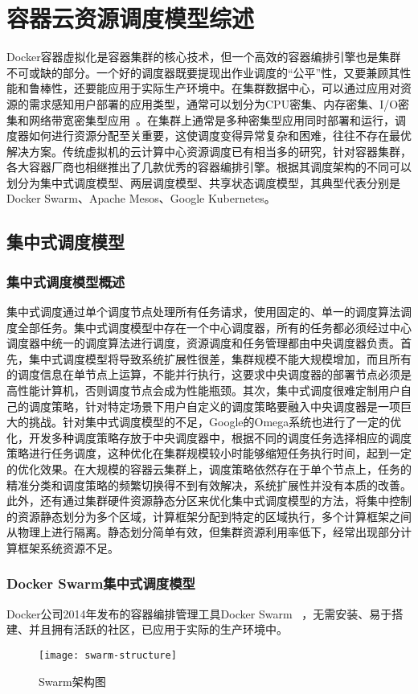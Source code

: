 \chapter{容器云资源调度模型综述}
Docker容器虚拟化是容器集群的核心技术，但一个高效的容器编排引擎也是集群不可或缺的部分。一个好的调度器既要提现出作业调度的“公平”性，又要兼顾其性能和鲁棒性，还要能应用于实际生产环境中。在集群数据中心，可以通过应用对资源的需求感知用户部署的应用类型，通常可以划分为CPU密集、内存密集、I/O密集和网络带宽密集型应用~\cite{Peng2016Research,Shuangke2017SchedulingStrategy}。在集群上通常是多种密集型应用同时部署和运行，调度器如何进行资源分配至关重要，这使调度变得异常复杂和困难，往往不存在最优解决方案。传统虚拟机的云计算中心资源调度已有相当多的研究，针对容器集群，各大容器厂商也相继推出了几款优秀的容器编排引擎。根据其调度架构的不同可以划分为集中式调度模型、两层调度模型、共享状态调度模型，其典型代表分别是Docker Swarm、Apache Mesos、Google Kubernetes。

\section{集中式调度模型}
\subsection{集中式调度模型概述}
集中式调度通过单个调度节点处理所有任务请求，使用固定的、单一的调度算法调度全部任务。集中式调度模型中存在一个中心调度器，所有的任务都必须经过中心调度器中统一的调度算法进行调度，资源调度和任务管理都由中央调度器负责。首先，集中式调度模型将导致系统扩展性很差，集群规模不能大规模增加，而且所有的调度信息在单节点上运算，不能并行执行，这要求中央调度器的部署节点必须是高性能计算机，否则调度节点会成为性能瓶颈。其次，集中式调度很难定制用户自己的调度策略，针对特定场景下用户自定义的调度策略要融入中央调度器是一项巨大的挑战。针对集中式调度模型的不足，Google的Omega系统也进行了一定的优化，开发多种调度策略存放于中央调度器中，根据不同的调度任务选择相应的调度策略进行任务调度，这种优化在集群规模较小时能够缩短任务执行时间，起到一定的优化效果。在大规模的容器云集群上，调度策略依然存在于单个节点上，任务的精准分类和调度策略的频繁切换得不到有效解决，系统扩展性并没有本质的改善。此外，还有通过集群硬件资源静态分区来优化集中式调度模型的方法，将集中控制的资源静态划分为多个区域，计算框架分配到特定的区域执行，多个计算框架之间从物理上进行隔离。静态划分简单有效，但集群资源利用率低下，经常出现部分计算框架系统资源不足。

\subsection{Docker Swarm集中式调度模型}
Docker公司2014年发布的容器编排管理工具Docker Swarm~\cite{Jansen2016Employing,Naik2016Building} ，无需安装、易于搭建、并且拥有活跃的社区，已应用于实际的生产环境中。
\begin{figure}[H] %
	\centering
	\texttt{[image: swarm-structure]}
	\caption{Swarm架构图}
\end{figure}

